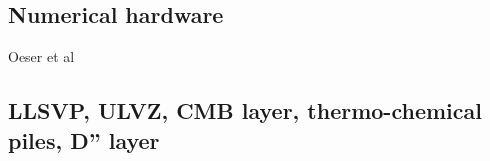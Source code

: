 \subsection{Numerical hardware}
\label{sec:topics:hardware}

\begin{scriptsize}
Oeser et al \cite{oebm06}
\end{scriptsize}

\subsection{LLSVP, ULVZ, CMB layer, thermo-chemical piles, D'' layer}

